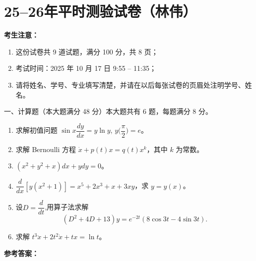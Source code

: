 \section{25--26年平时测验试卷（林伟）}



\textbf{考生注意：}
\begin{enumerate}
    \item 这份试卷共 9 道试题，满分 100 分，共 8 页；
    \item 考试时间：2025 年 10 月 17 日 9:55 -- 11:35；
    \item 请将姓名、学号、专业填写清楚，并请在以后每张试卷的页眉处注明学号、姓名。
\end{enumerate}

一、计算题（本大题满分 48 分）本大题共有 6 题，每题满分 8 分。

\begin{enumerate}
    \item 求解初值问题 $\sin x \dfrac{dy}{dx} = y \ln y$, $y \Big( \dfrac{\pi}{2} \Big) = e$。
    
    \item 求解 Bernoulli 方程 $\dot{x} + p(t)x = q(t)x^k$，其中 $k$ 为常数。
    
    \item $(x^2 + y^2 + x)dx + ydy = 0$。
    
    \item $\dfrac{d}{dx}\left[y\left(x^2 + 1\right)\right] = x^5 + 2x^3 + x + 3xy$，求 $y = y(x)$。
    
    \item 设$D=\dfrac{d}{dt}$,用算子法求解 
    \[(D^2+4D+13)y = e^{-2t}(8\cos 3t - 4 \sin 3t).\]
    
    \item 求解 $t^3 \ddot{x} + 2t^2 \dot{x} + tx = \ln t$。
\end{enumerate}

\textbf{参考答案：}

